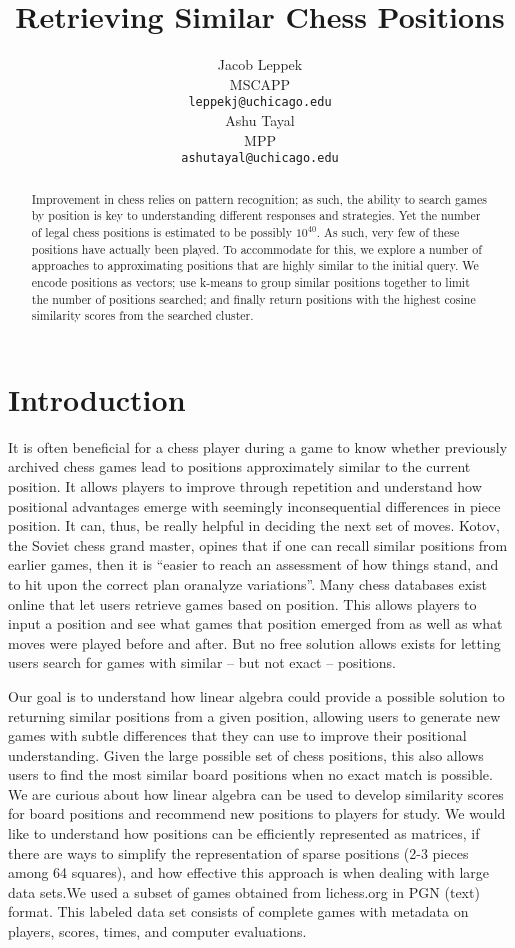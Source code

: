 \documentclass{article}
\title{Retrieving Similar Chess Positions}
\author{%
  Jacob Leppek \\
  MSCAPP\\
  \texttt{leppekj@uchicago.edu} \\
\And
Ashu Tayal \\
MPP\\
\texttt{ashutayal@uchicago.edu} \\
}
\begin{document}
\maketitle

\begin{abstract}
   Improvement in chess relies on pattern recognition; as such, the ability to search
  games by position is key to understanding different responses and strategies. Yet the
  number of legal chess positions is estimated to be possibly $10^{40}$. As such, very few
  of these positions have actually been played. To accommodate for this, we explore a number
  of approaches to approximating positions that are highly similar to the initial query. We
  encode positions as vectors; use k-means to group similar positions together to limit the
  number of positions searched; and finally return positions with the highest cosine similarity
  scores from the searched cluster.
\end{abstract}

\section{Introduction}

    It is often beneficial for a chess player during a game to know whether previously archived chess games lead to positions approximately similar to the current position. It allows players to improve through repetition and understand how positional advantages emerge with seemingly inconsequential differences in piece position. It can, thus, be really helpful in deciding the next set of moves. Kotov, the Soviet chess grand master, opines that if one can recall similar positions from earlier games, then it is “easier to reach an assessment of how things stand, and to hit upon the correct plan oranalyze variations”. Many chess databases exist online that let users retrieve games based on position. This allows players to input a position and see what games that position emerged from as well as what moves were played before and after. But no free solution allows exists for letting users search for games with similar – but not exact – positions.

 Our goal is to understand how linear algebra could provide a possible solution to returning similar positions from a given position, allowing users to generate new games with subtle differences that they can use to improve their positional understanding. Given the large possible set of chess positions, this also allows users to find the most similar board positions when no exact match is possible. We are curious about how linear algebra can be used to develop similarity scores for board positions and recommend new positions to players for study. We would like to understand how positions can be efficiently represented as matrices, if there are ways to simplify the representation of sparse positions (2-3 pieces among 64 squares), and how effective this approach is when dealing with large data sets.We used a subset of games obtained from lichess.org in PGN (text) format. This labeled data set consists of complete games with metadata on players, scores, times, and computer evaluations.
\end{document}
